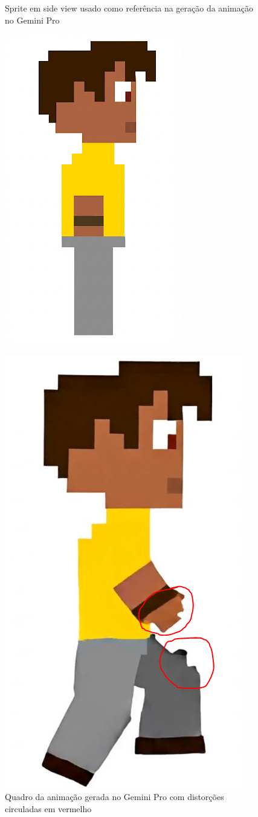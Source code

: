 \begin{figure}[htbp]
    \centering
    \begin{minipage}{0.45\textwidth}
        \centering
        \caption{\small Sprite em side view usado como referência na geração da animação no Gemini Pro}
        \label{fig:GeminiProAndarSide1}
        \includegraphics[width=0.5\linewidth]{figs/geminiPro/chat6/tela2_res4.png}
    \end{minipage}\hfill
    \begin{minipage}{0.45\textwidth}
        \centering
        \caption{\small Quadro da animação gerada no Gemini Pro com distorções circuladas em vermelho}
        \label{fig:GeminiProAndarDeformacao}
        \includegraphics[width=0.5\linewidth]{figs/geminiPro/chat7/deformacoes1.PNG}
    \end{minipage}
\end{figure}

